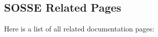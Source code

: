 \subsection{SOSSE Related Pages}
Here is a list of all related documentation pages:\begin{CompactList}
\item {}

\end{CompactList}
